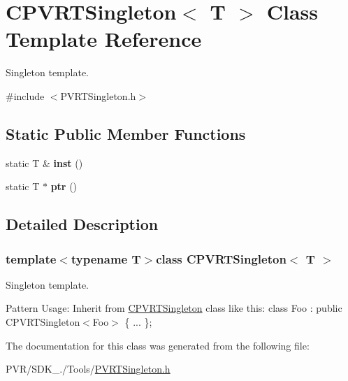 \hypertarget{class_c_p_v_r_t_singleton}{\section{C\+P\+V\+R\+T\+Singleton$<$ T $>$ Class Template Reference}
\label{class_c_p_v_r_t_singleton}
}


Singleton template.  




{\ttfamily \#include $<$P\+V\+R\+T\+Singleton.\+h$>$}

\subsection*{Static Public Member Functions}
\begin{DoxyCompactItemize}
\item 
\hypertarget{class_c_p_v_r_t_singleton_aa9101373524b2b4a17b3cf0ba26fe56c}{static T \& {\bfseries inst} ()}\label{class_c_p_v_r_t_singleton_aa9101373524b2b4a17b3cf0ba26fe56c}

\item 
\hypertarget{class_c_p_v_r_t_singleton_a75768d8e7b062fe856341d213c1b38cf}{static T $\ast$ {\bfseries ptr} ()}\label{class_c_p_v_r_t_singleton_a75768d8e7b062fe856341d213c1b38cf}

\end{DoxyCompactItemize}


\subsection{Detailed Description}
\subsubsection*{template$<$typename T$>$class C\+P\+V\+R\+T\+Singleton$<$ T $>$}

Singleton template. 





Pattern Usage\+: Inherit from \hyperlink{class_c_p_v_r_t_singleton}{C\+P\+V\+R\+T\+Singleton} class like this\+: class Foo \+: public C\+P\+V\+R\+T\+Singleton$<$\+Foo$>$ \{ ... \}; 

The documentation for this class was generated from the following file\+:\begin{DoxyCompactItemize}
\item 
P\+V\+R/\+S\+D\+K\+\_./\+Tools/\hyperlink{_p_v_r_t_singleton_8h}{P\+V\+R\+T\+Singleton.\+h}\end{DoxyCompactItemize}
